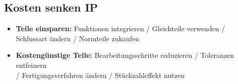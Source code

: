 \subsection{Kosten senken \hfill IP}
    \begin{scriptsize}
        \begin{itemize}
            \item \textbf{Teile einsparen:} Funktionen integrieren / Gleichteile verwenden / Schlussart ändern / Normteile zukaufen
            \item \textbf{Kostengünstige Teile:} Bearbeitungsschritte reduzieren / Toleranzen entfeinern \\/ Fertigungsverfahren ändern / Stückzahleffekt nutzen
        \end{itemize}
    \end{scriptsize}